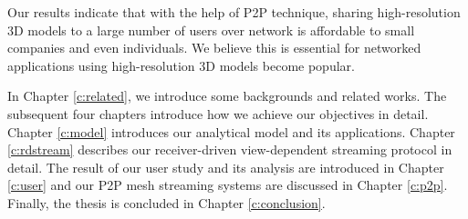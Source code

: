     Our results indicate that with the help of P2P technique,
    sharing high-resolution
    3D models to a large number of users over network is affordable
    to small companies and even individuals. We believe this is
    essential for networked applications using high-resolution 3D models
    become popular.

    In Chapter \ref{c:related}, we introduce some backgrounds and related works.
    The subsequent four chapters introduce how we achieve our objectives in detail.
    Chapter \ref{c:model} introduces our analytical model and its applications.
    Chapter \ref{c:rdstream} describes our receiver-driven view-dependent streaming
    protocol in detail. The result of our user study and its analysis are introduced
    in Chapter \ref{c:user} and our P2P mesh streaming systems
    are discussed in Chapter \ref{c:p2p}. Finally, the thesis is concluded in
    Chapter \ref{c:conclusion}.
